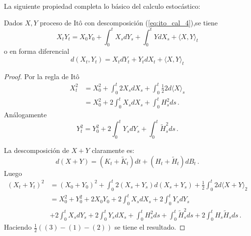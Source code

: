 La siguiente propiedad completa lo básico del calculo estocástico:
\begin{proposition}
Dados $X,Y$ proceso de It\^{o} con descomposición (\ref{eq:ito_cal_4}),se tiene 
\begin{equation*}
    X_t Y_t = X_0 Y_0 + \int_{0}^{t} X_s dY_s + \int_{0}^{t} Y dX_s + \langle X,Y \rangle_t
\end{equation*}
o en forma diferencial 
\begin{equation*}
    d(X_t, Y_t) = X_t dY_t + Y_t dX_t + \langle X,Y \rangle_t
\end{equation*}
\end{proposition}
\begin{proof}
\gris
Por la regla de It\^{o} 
\begin{align*}
    \label{eq:ito_cal_5_1}
    \tag{1}
    X^2_{t} &= X^2_{0} + \int_{0}^{t} 2 X_s dX_s + \int_{0}^{t} \frac{1}{2} 2 d \langle X \rangle_s\\
            &= X^2_{0} + 2 \int_{0}^{t} X_s d X_s + \int_{0}^{t} H_s^2 ds \,.
\end{align*}
Análogamente
\begin{equation*}
    \label{eq:ito_cal_5_2}
    \tag{2}
    Y^2_{t} = Y^2_{0} + 2 \int_{0}^{t} Y_s d Y_s + \int_{0}^{t} \tilde{H}_s^2 ds \,.
\end{equation*}

La descomposición de $X + Y$ claramente es: 
\begin{equation*}
        d(X +Y) = (K_t + \tilde{K}_t) dt + (H_t + \tilde{H}_t) dB_t \,.
\end{equation*}
Luego 
\begin{align*}
    (X_t + Y_t)^2 & = (X_0 + Y_0)^2 + \int_{0}^{t} 2 (X_s + Y_s) d(X_s + Y_s) + \frac{1}{2} \int_{0}^{t} 2d \langle X + Y \rangle_2 \\
    &=X_0^2 + Y_0^2 + 2X_0Y_0 + 2 \int_{0}^{t} X_s dX_s + 2 \int_{0}^{t} Y_s dY_s  \\
    &+ 2 \int_{0}^{t} X_s dY_s + 2 \int_{0}^{t} Y_s dX_s + \int_{0}^{t} H_s^2 ds + \int_{0}^{t} \tilde{H}_s^2 ds + 2 \int_{0}^{t} H_s \tilde{H}_s ds \,.
\end{align*}
Haciendo $\frac{1}{2} ( (3) - (1) - (2) )$ se tiene el resultado.\findem
\negro
\end{proof}

% 

% 

